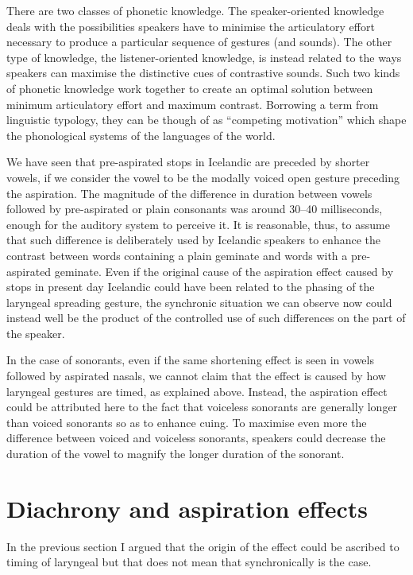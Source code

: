 \documentclass[11pt,a4paper,openany]{memoir}\usepackage[]{graphicx}\usepackage[]{color}
\begin{document}
There are two classes of phonetic knowledge.
The speaker-oriented knowledge deals with the possibilities speakers have to minimise the articulatory effort necessary to produce a particular sequence of gestures (and sounds).
The other type of knowledge, the listener-oriented knowledge, is instead related to the ways speakers can maximise the distinctive cues of contrastive sounds.
Such two kinds of phonetic knowledge work together to create an optimal solution between minimum articulatory effort and maximum contrast.
Borrowing a term from linguistic typology, they can be though of as ``competing motivation'' which shape the phonological systems of the languages of the world.

We have seen that pre-aspirated stops in Icelandic are preceded by shorter vowels, if we consider the vowel to be the modally voiced open gesture preceding the aspiration.
The magnitude of the difference in duration between vowels followed by pre-aspirated or plain consonants was around 30--40 milliseconds, enough for the auditory system to perceive it.
It is reasonable, thus, to assume that such difference is deliberately used by Icelandic speakers to enhance the contrast between words containing a plain geminate and words with a pre-aspirated geminate.
Even if the original cause of the aspiration effect caused by stops in present day Icelandic could have been related to the phasing of the laryngeal spreading gesture, the synchronic situation we can observe now could instead well be the product of the controlled use of such differences on the part of the speaker.

In the case of sonorants, even if the same shortening effect is seen in vowels followed by aspirated nasals, we cannot claim that the effect is caused by how laryngeal gestures are timed, as explained above.
Instead, the aspiration effect could be attributed here to the fact that voiceless sonorants are generally longer than voiced sonorants so as to enhance cuing.
To maximise even more the difference between voiced and voiceless sonorants, speakers could decrease the duration of the vowel to magnify the longer duration of the sonorant.




\section{Diachrony and aspiration effects}
In the previous section I argued that the origin of the effect could be ascribed to timing of laryngeal but that does not mean that synchronically is the case.
\end{document}
